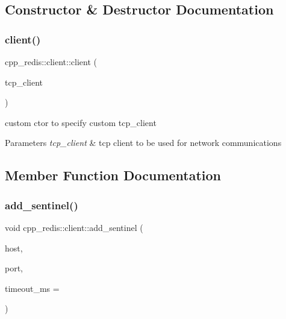 \subsection{Constructor \& Destructor Documentation}
\mbox{\label{classcpp__redis_1_1client_ae879c3a6829a2da9d03f80c1ec4b8d9b}} 
\subsubsection{\texorpdfstring{client()}{client()}}
{\footnotesize\ttfamily cpp\+\_\+redis\+::client\+::client (\begin{DoxyParamCaption}\item[{const std\+::shared\+\_\+ptr$<$ \mbox{\hyperlink{classcpp__redis_1_1network_1_1tcp__client__iface}{network\+::tcp\+\_\+client\+\_\+iface}} $>$ \&}]{tcp\+\_\+client }\end{DoxyParamCaption})\hspace{0.3cm}{\ttfamily [explicit]}}

custom ctor to specify custom tcp\+\_\+client


\begin{DoxyParams}{Parameters}
{\em tcp\+\_\+client} & tcp client to be used for network communications \\
\hline
\end{DoxyParams}


\subsection{Member Function Documentation}
\mbox{\label{classcpp__redis_1_1client_abd52019ee708559179c501892e6448dc}} 
\subsubsection{\texorpdfstring{add\+\_\+sentinel()}{add\_sentinel()}}
{\footnotesize\ttfamily void cpp\+\_\+redis\+::client\+::add\+\_\+sentinel (\begin{DoxyParamCaption}\item[{const std\+::string \&}]{host,  }\item[{std\+::size\+\_\+t}]{port,  }\item[{std\+::uint32\+\_\+t}]{timeout\+\_\+ms = {} }\end{DoxyParamCaption})}

